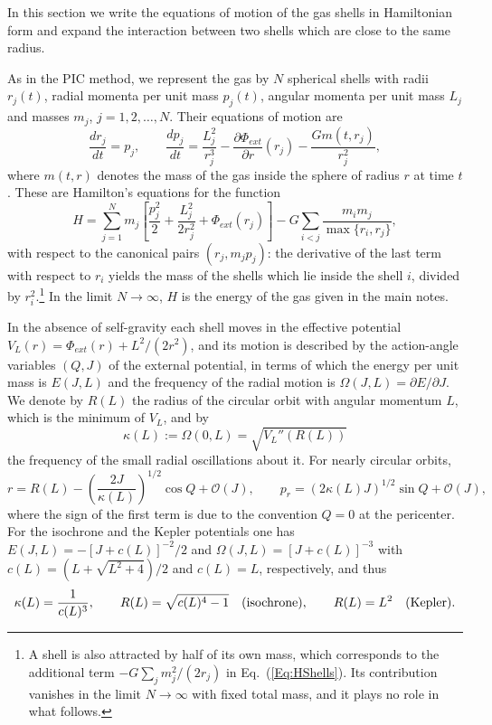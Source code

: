 \documentclass[prd,aps,nofootinbib,superscriptaddress,amsmath,amssymb]{revtex4}
\begin{document}
In this section we write the equations of motion of the gas shells in Hamiltonian form and expand the interaction between two shells which are close to the same radius.

As in the PIC method, we represent the gas by $N$ spherical shells with radii $r_j(t)$, radial momenta per unit mass $p_j(t)$, angular momenta per unit mass $L_j$ and masses $m_j$, $j = 1,2,\ldots,N$. Their equations of motion are
\begin{equation}
\frac{dr_j}{dt} = p_j,\qquad
\frac{dp_j}{dt} = \frac{L_j^2}{r_j^3} - \frac{\partial\Phi_{ext}}{\partial r}(r_j) - \frac{G m(t,r_j)}{r_j^2},
\label{Eq:EOM}
\end{equation}
where $m(t,r)$ denotes the mass of the gas inside the sphere of radius $r$ at time $t$. These are Hamilton's equations for the function
\begin{equation}
H = \sum\limits_{j=1}^N m_j\left[ \frac{p_j^2}{2} + \frac{L_j^2}{2r_j^2} + \Phi_{ext}(r_j) \right]
 - G\sum\limits_{i<j} \frac{m_i m_j}{\max\{ r_i,r_j \}},
\label{Eq:HShells}
\end{equation}
with respect to the canonical pairs $(r_j,m_j p_j)$: the derivative of the last term with respect to $r_i$ yields the mass of the shells which lie inside the shell $i$, divided by $r_i^2$.\footnote{A shell is also attracted by half of its own mass, which corresponds to the additional term $-G\sum_j m_j^2/(2r_j)$ in Eq.~(\ref{Eq:HShells}). Its contribution vanishes in the limit $N\to \infty$ with fixed total mass, and it plays no role in what follows.} In the limit $N\to \infty$, $H$ is the energy of the gas given in the main notes.

In the absence of self-gravity each shell moves in the effective potential $V_L(r) = \Phi_{ext}(r) + L^2/(2r^2)$, and its motion is described by the action-angle variables $(Q,J)$ of the external potential, in terms of which the energy per unit mass is $E(J,L)$ and the frequency of the radial motion is $\Omega(J,L) = \partial E/\partial J$. We denote by $R(L)$ the radius of the circular orbit with angular momentum $L$, which is the minimum of $V_L$, and by
\begin{equation}
\kappa(L) := \Omega(0,L) = \sqrt{V_L''(R(L))}
\label{Eq:kappa}
\end{equation}
the frequency of the small radial oscillations about it. For nearly circular orbits,
\begin{equation}
r = R(L) - \left( \frac{2J}{\kappa(L)} \right)^{1/2}\cos Q + \mathcal{O}(J),\qquad
p_r = \left( 2\kappa(L) J \right)^{1/2}\sin Q + \mathcal{O}(J),
\label{Eq:Epicycle}
\end{equation}
where the sign of the first term is due to the convention $Q = 0$ at the pericenter. For the isochrone and the Kepler potentials one has $E(J,L) = -[J + c(L)]^{-2}/2$ and $\Omega(J,L) = [J + c(L)]^{-3}$ with $c(L) = (L + \sqrt{L^2 + 4})/2$ and $c(L) = L$, respectively, and thus
\begin{equation}
\kappa(L) = \frac{1}{c(L)^3},\qquad
R(L) = \sqrt{c(L)^4 - 1}\quad\hbox{(isochrone)},\qquad
R(L) = L^2\quad\hbox{(Kepler)}.
\label{Eq:RkappaIsochrone}
\end{equation}
\end{document}
